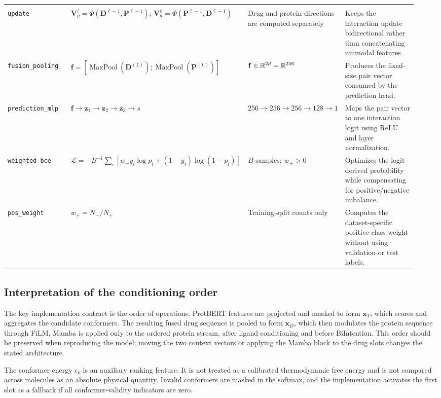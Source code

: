 \begin{longtable}{>{\RaggedRight\arraybackslash}p{0.20\linewidth}>{\RaggedRight\arraybackslash}p{0.28\linewidth}>{\RaggedRight\arraybackslash}p{0.18\linewidth}>{\RaggedRight\arraybackslash}p{0.28\linewidth}}
\shortstack[l]{\texttt{bidirectional\_intention\_}\\\texttt{update}} & $\mathbf V_p^\ell=\Phi(\mathbf D^{\ell-1},\mathbf P^{\ell-1})$; $\mathbf V_d^\ell=\Phi(\mathbf P^{\ell-1},\mathbf D^{\ell-1})$ & Drug and protein directions are computed separately & Keeps the interaction update bidirectional rather than concatenating unimodal features. \\
\texttt{fusion\_pooling} & $\mathbf f=[\operatorname{MaxPool}(\mathbf D^{(L)});\operatorname{MaxPool}(\mathbf P^{(L)})]$ & $\mathbf f\in\mathbb{R}^{2d}=\mathbb{R}^{256}$ & Produces the fixed-size pair vector consumed by the prediction head. \\
\texttt{prediction\_mlp} & $\mathbf f\to\mathbf z_1\to\mathbf z_2\to\mathbf z_3\to s$ & $256\to256\to256\to128\to1$ & Maps the pair vector to one interaction logit using ReLU and layer normalization. \\
\texttt{weighted\_bce} & $\mathcal L=-B^{-1}\sum_i[w_+y_i\log p_i+(1-y_i)\log(1-p_i)]$ & $B$ samples; $w_+>0$ & Optimizes the logit-derived probability while compensating for positive/negative imbalance. \\
\texttt{pos\_weight} & $w_+=N_-/N_+$ & Training-split counts only & Computes the dataset-specific positive-class weight without using validation or test labels. \\
\end{longtable}

\subsection{Interpretation of the conditioning order}

The key implementation contract is the order of operations. ProtBERT features
are projected and masked to form $\mathbf x_T$, which scores and aggregates
the candidate conformers. The resulting fused drug sequence is pooled to form
$\mathbf x_D$, which then modulates the protein sequence through FiLM. Mamba is
applied only to the ordered protein stream, after ligand conditioning and before
BiIntention. This order should be preserved when reproducing the model; moving
the two context vectors or applying the Mamba block to the drug slots changes
the stated architecture.

The conformer energy $\epsilon_k$ is an auxiliary ranking feature. It is not
treated as a calibrated thermodynamic free energy and is not compared across
molecules as an absolute physical quantity. Invalid conformers are masked in
the softmax, and the implementation activates the first slot as a fallback if
all conformer-validity indicators are zero.
